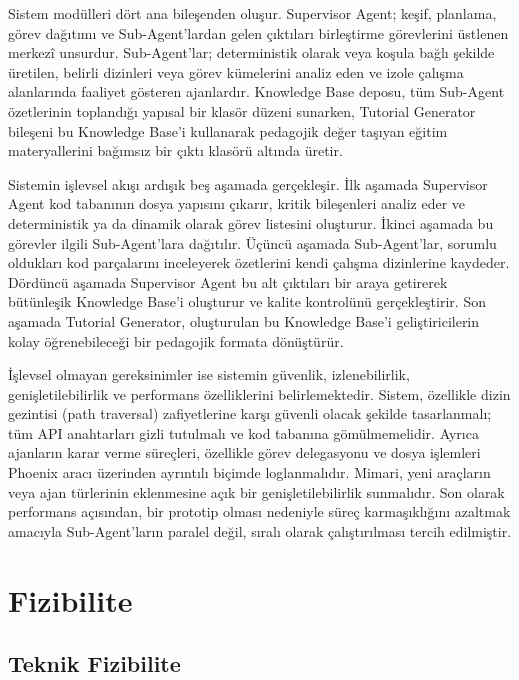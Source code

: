 Sistem modülleri dört ana bileşenden oluşur. Supervisor Agent; keşif, planlama, görev dağıtımı ve Sub-Agent'lardan gelen çıktıları birleştirme görevlerini üstlenen merkezî unsurdur. Sub-Agent'lar; deterministik olarak veya koşula bağlı şekilde üretilen, belirli dizinleri veya görev kümelerini analiz eden ve izole çalışma alanlarında faaliyet gösteren ajanlardır. Knowledge Base deposu, tüm Sub-Agent özetlerinin toplandığı yapısal bir klasör düzeni sunarken, Tutorial Generator bileşeni bu Knowledge Base’i kullanarak pedagojik değer taşıyan eğitim materyallerini bağımsız bir çıktı klasörü altında üretir.

Sistemin işlevsel akışı ardışık beş aşamada gerçekleşir. İlk aşamada Supervisor Agent kod tabanının dosya yapısını çıkarır, kritik bileşenleri analiz eder ve deterministik ya da dinamik olarak görev listesini oluşturur. İkinci aşamada bu görevler ilgili Sub-Agent'lara dağıtılır. Üçüncü aşamada Sub-Agent'lar, sorumlu oldukları kod parçalarını inceleyerek özetlerini kendi çalışma dizinlerine kaydeder. Dördüncü aşamada Supervisor Agent bu alt çıktıları bir araya getirerek bütünleşik Knowledge Base’i oluşturur ve kalite kontrolünü gerçekleştirir. Son aşamada Tutorial Generator, oluşturulan bu Knowledge Base’i geliştiricilerin kolay öğrenebileceği bir pedagojik formata dönüştürür.

İşlevsel olmayan gereksinimler ise sistemin güvenlik, izlenebilirlik, genişletilebilirlik ve performans özelliklerini belirlemektedir. Sistem, özellikle dizin gezintisi (path traversal) zafiyetlerine karşı güvenli olacak şekilde tasarlanmalı; tüm API anahtarları gizli tutulmalı ve kod tabanına gömülmemelidir. Ayrıca ajanların karar verme süreçleri, özellikle görev delegasyonu  ve dosya işlemleri Phoenix aracı üzerinden ayrıntılı biçimde loglanmalıdır. Mimari, yeni araçların veya ajan türlerinin eklenmesine açık bir genişletilebilirlik sunmalıdır. Son olarak performans açısından, bir prototip olması nedeniyle süreç karmaşıklığını azaltmak amacıyla Sub-Agent'ların paralel değil, sıralı olarak çalıştırılması tercih edilmiştir.

\section{Fizibilite}
\label{sec:fizibilite}

\subsection{Teknik Fizibilite}
\label{sec:teknik-fizibilite}

